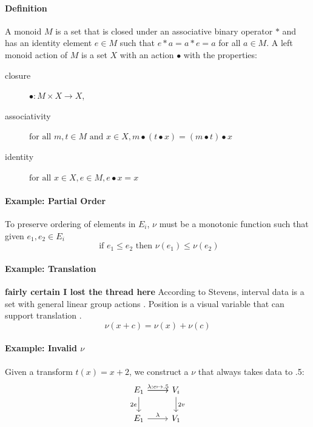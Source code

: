 \documentclass[../main.tex]{subfiles}
\begin{document}
\paragraph{Definition}
A monoid\cite{Monoid2021} $M$ is a set that is closed under an associative binary operator $\ast$ and has an identity element $e\in M$ such that $e\ast a= a \ast e = a$ for all $a \in M$.  A left monoid action \cite{SemigroupAction2021,ActionNLab} of $M$ is a set $X$ with an action $\bullet$ with the properties:
\begin{description}
    \item[closure] $\bullet: M\times X \rightarrow X$,
    \item[associativity] $\text{for all } m,t \in M \text{ and } x\in X, m\bullet(t\bullet x) = (m\bullet t) \bullet x$
    \item[identity] $\text{for all } x\in X, e\in M,  e\bullet x = x$ 
\end{description} 

\paragraph{Example: Partial Order}
To preserve ordering of elements in $E_i$, $\nu$ must be a monotonic function such that given $e_1, e_2 \in E_{i}$
\begin{equation}
\text{ if } e_1 \leq e_2 \text{ then } \nu(e_1) \leq \nu(e_2)
\end{equation}

\paragraph{Example: Translation}
\textbf{fairly certain I lost the thread here}
According to Stevens, interval data is a set with general linear group actions \cite{stevensTheoryScalesMeasurement1946,leaFormalizationMeasurementScale}. Position is a visual variable that can support translation \cite{bertinIIPropertiesGraphic2011,krygierMakingMapsVisual2005,munznerMarksChannels}. 
\begin{equation}
\nu(x + c) = \nu(x) + \nu(c)
\end{equation}


\paragraph{Example: Invalid $\nu$}
Given a transform $t(x) = x+2$, we construct a $\nu$ that always takes data to .5: 
\begin{equation}
    \label{eq:nu_equation_bad}
    \begin{tikzcd}
        E_1 \arrow[r] \arrow[r, "\lambda:e\mapsto.5"] \arrow[d, "2e"'] & V_i \arrow[d, "2v"] \\
        E_1 \arrow[r, "\lambda"]                                        & V_1                 
    \end{tikzcd}
\end{equation}
\end{document}

